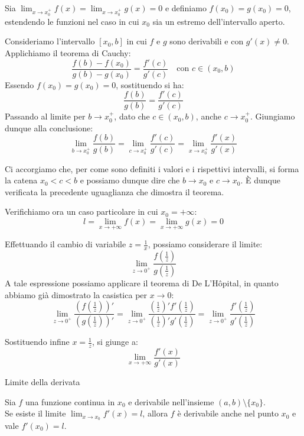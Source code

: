 \documentclass[12pt]{report}
\begin{document}
	\begin{dimostrazione}{}{}
		
		Sia $\lim_{x \to x_0^+} f(x) = \lim_{x \to x_0^+} g(x) = 0$ e definiamo $f(x_0) = g(x_0) = 0$, estendendo le funzioni nel caso in cui $x_0$ sia un estremo dell'intervallo aperto.
		
		Consideriamo l'intervallo $[x_0, b]$ in cui $f$ e $g$ sono derivabili e con $g'(x) \neq 0$. Applichiamo il teorema di Cauchy:
		\[
		\frac{f(b) - f(x_0)}{g(b) - g(x_0)} = \frac{f'(c)}{g'(c)} \quad \text{con } c \in (x_0, b)
		\]
		Essendo $f(x_0) = g(x_0) = 0$, sostituendo si ha:
		\[
		\frac{f(b)}{g(b)} = \frac{f'(c)}{g'(c)}
		\]
		Passando al limite per $b \to x_0^+$, dato che $c \in (x_0, b)$, anche $c \to x_0^+$. Giungiamo dunque alla conclusione:
		\[
		\lim_{b \to x_0^+} \frac{f(b)}{g(b)} = \lim_{c \to x_0^+} \frac{f'(c)}{g'(c)} = \lim_{x \to x_0^+} \frac{f'(x)}{g'(x)}
		\]
		
		Ci accorgiamo che, per come sono definiti i valori e i rispettivi intervalli, si forma la catena $x_0 < c < b$ e possiamo dunque dire che $b \to x_0$ e $c \to x_0$.
		È dunque verificata la precedente uguaglianza che dimostra il teorema.
		
		Verifichiamo ora un caso particolare in cui $x_0 = +\infty$:
		\[
		l = \lim_{x \to +\infty} f(x) = \lim_{x \to +\infty} g(x) = 0
		\]
		
		Effettuando il cambio di variabile $z = \frac{1}{x}$, possiamo considerare il limite:
		\[
		\lim_{z \to 0^+} \frac{f\left(\frac{1}{z}\right)}{g\left(\frac{1}{z}\right)}
		\]
		A tale espressione possiamo applicare il teorema di De L'Hôpital, in quanto abbiamo già dimostrato la casistica per $x \to 0$:
		\[
		\lim_{z \to 0^+} \frac{\left(f\left(\frac{1}{z}\right)\right)'}{\left(g\left(\frac{1}{z}\right)\right)'} = \lim_{z \to 0^+} \frac{\left(\frac{1}{z}\right)' f'\left(\frac{1}{z}\right)}{\left(\frac{1}{z}\right)' g'\left(\frac{1}{z}\right)} = \lim_{z \to 0^+} \frac{f'\left(\frac{1}{z}\right)}{g'\left(\frac{1}{z}\right)}
		\]
		
		Sostituendo infine $x = \frac{1}{z}$, si giunge a:
		\[
		\lim_{x \to +\infty} \frac{f'(x)}{g'(x)}
		\]
		
	\end{dimostrazione}
	
	\begin{teorema}{Limite della derivata}{}
		
		Sia $f$ una funzione continua in $x_0$ e derivabile nell'insieme $(a, b) \setminus \{x_0\}$.\\
		Se esiste il limite $\lim_{x \to x_0} f'(x) = l$, allora $f$ è derivabile anche nel punto $x_0$ e vale $f'(x_0) = l$.
		
	\end{teorema}
	
\end{document}
